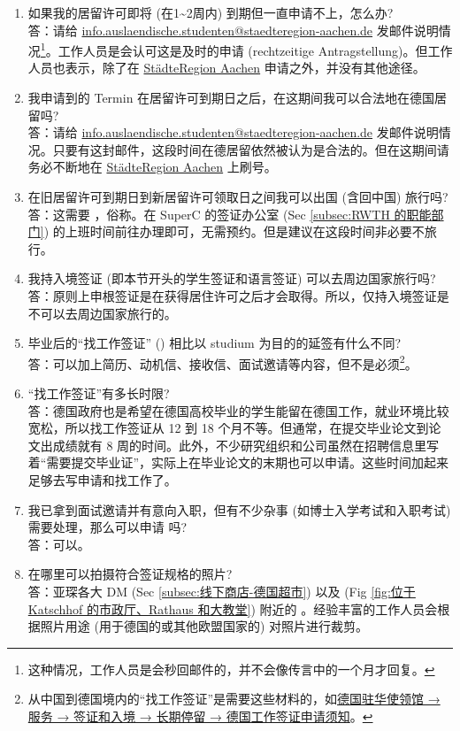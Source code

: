     \begin{enumerate}
      \item 如果我的居留许可即将 (在1\textasciitilde2周内) 到期但一直申请不上，怎么办?\\
      答：请给 \href{mailto:info.auslaendische.studenten@staedteregion-aachen.de}{info.auslaendische.studenten@staedteregion-aachen.de} 发邮件说明情况\footnote{这种情况，工作人员是会秒回邮件的，并不会像传言中的一个月才回复。}。工作人员是会认可这是及时的申请 (rechtzeitige Antragstellung)。但工作人员也表示，除了在 \href{https://termine.staedteregion-aachen.de/auslaenderamt/}{StädteRegion Aachen} 申请之外，并没有其他途径。
      \item 我申请到的 Termin 在居留许可到期日之后，在这期间我可以合法地在德国居留吗?\\
      答：请给 \href{mailto:info.auslaendische.studenten@staedteregion-aachen.de}{info.auslaendische.studenten@staedteregion-aachen.de} 发邮件说明情况。只要有这封邮件，这段时间在德居留依然被认为是合法的。但在这期间请务必不断地在 \href{https://termine.staedteregion-aachen.de/auslaenderamt/}{StädteRegion Aachen} 上刷号。
      \item 在旧居留许可到期日到新居留许可领取日之间我可以出国 (含回中国) 旅行吗?\\
      答：这需要 ，俗称。在 SuperC 的签证办公室 (Sec \ref{subsec:RWTH 的职能部门}) 的上班时间前往办理即可，无需预约。但是建议在这段时间非必要不旅行。
      \item 我持入境签证 (即本节开头的学生签证和语言签证) 可以去周边国家旅行吗?\\
      答：原则上申根签证是在获得居住许可之后才会取得。所以，仅持入境签证是不可以去周边国家旅行的。
      \item 毕业后的``找工作签证'' () 相比以 studium 为目的的延签有什么不同?\\
      答：可以加上简历、动机信、接收信、面试邀请等内容，但不是必须\footnote{从中国到德国境内的``找工作签证''是需要这些材料的，如\href{https://china.diplo.de/blob/1341662/3467e6cb74888d4cb9d8e188c4f4308b/pdf-merkblatt-natvisum-arbeitsaufnahme-data.pdf}{德国驻华使领馆 → 服务 → 签证和入境 → 长期停留 → 德国工作签证申请须知}。}。
      \item ``找工作签证''有多长时限?\\
      答：德国政府也是希望在德国高校毕业的学生能留在德国工作，就业环境比较宽松，所以找工作签证从 12 到 18 个月不等。但通常，在提交毕业论文到论文出成绩就有 8 周的时间。此外，不少研究组织和公司虽然在招聘信息里写着``需要提交毕业证''，实际上在毕业论文的末期也可以申请。这些时间加起来足够去写申请和找工作了。
      \item 我已拿到面试邀请并有意向入职，但有不少杂事 (如博士入学考试和入职考试) 需要处理，那么可以申请  吗?\\
      答：可以。
      \item 在哪里可以拍摄符合签证规格的照片?\\
      答：亚琛各大 DM (Sec \ref{subsec:线下商店-德国超市}) 以及 (Fig \ref{fig:位于 Katschhof 的市政厅、Rathaus 和大教堂}) 附近的 。经验丰富的工作人员会根据照片用途 (用于德国的或其他欧盟国家的) 对照片进行裁剪。
    \end{enumerate}
